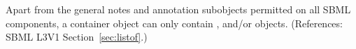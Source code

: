 Apart from the general notes and annotation subobjects permitted on all
SBML components, a \ListOfRules container object can only contain
\AssignmentRule, \AlgebraicRule and/or \RateRule objects.  (References:
SBML L3V1 Section~\ref{sec:listof}.)
